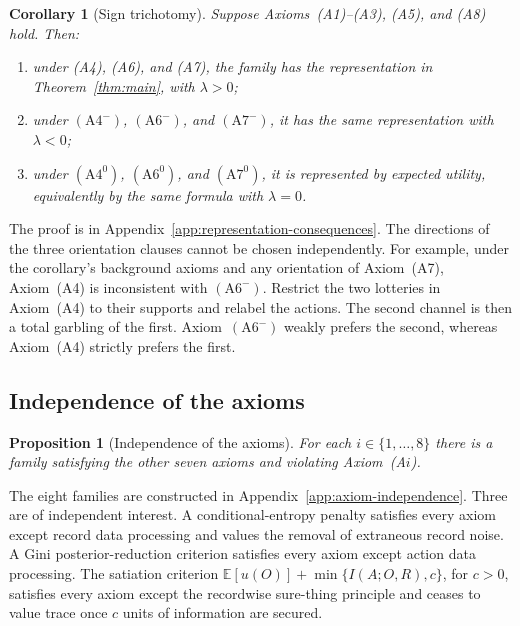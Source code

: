 \documentclass[11pt,a4paper]{article}
\newtheorem{proposition}[theorem]{Proposition}
\newtheorem{corollary}[theorem]{Corollary}
\theoremstyle{definition}
\newcommand{\E}{\mathbb E}
\newcommand{\1}{\mathbf 1}
\begin{document}
\begin{corollary}[Sign trichotomy]\label{cor:signduality}
Suppose Axioms~\textup{(A1)--(A3)}, \textup{(A5)}, and
\textup{(A8)} hold.  Then:
\begin{enumerate}[label=\textup{(\roman*)},leftmargin=*]
\item under \textup{(A4)}, \textup{(A6)}, and \textup{(A7)}, the family has the representation in
Theorem~\ref{thm:main}, with $\lambda>0$;
\item under $(\mathrm{A}4^-)$, $(\mathrm{A}6^-)$, and $(\mathrm{A}7^-)$, it has the same representation with
$\lambda<0$;
\item under $(\mathrm{A}4^0)$, $(\mathrm{A}6^0)$, and $(\mathrm{A}7^0)$, it is represented by expected utility,
equivalently by the same formula with $\lambda=0$.
\end{enumerate}

\end{corollary}

The proof is in Appendix~\ref{app:representation-consequences}.  The directions of the three orientation clauses cannot be chosen independently.  For example, under the
corollary's background axioms and any orientation of Axiom~\textup{(A7)}, Axiom~\textup{(A4)} is inconsistent
with $(\mathrm{A}6^-)$.  Restrict the two lotteries in Axiom~\textup{(A4)} to their supports and relabel the
actions.  The second channel is then a total garbling of the first.  Axiom~$(\mathrm{A}6^-)$ weakly prefers the
second, whereas Axiom~\textup{(A4)} strictly prefers the first.


\subsection{Independence of the axioms}

\begin{proposition}[Independence of the axioms]\label{prop:independence}
For each $i\in\{1,\ldots,8\}$ there is a family satisfying the other seven axioms and violating
Axiom~\textup{(A$i$)}.
\end{proposition}

The eight families are constructed in Appendix~\ref{app:axiom-independence}.  Three are of independent interest.  A conditional-entropy penalty satisfies every axiom except record data processing and values the removal of
extraneous record noise.  A Gini posterior-reduction criterion satisfies every axiom except action data processing.
The satiation criterion $\E[u(O)]+\min\{I(A;O,R),c\}$, for $c>0$, satisfies every axiom except the recordwise
sure-thing principle and ceases to value trace once $c$ units of information are secured.
\end{document}
